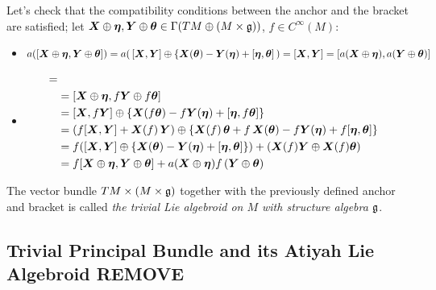 Let's check that the compatibility conditions between the anchor and the bracket are satisfied; let $\bm{X} \oplus \bm{\eta}, \bm{Y} \oplus \bm{\theta} \in \Gamma(TM \oplus (M \times \mathfrak{g}))$, $f \in C^\infty(M)$:

    \begin{itemize}
    \item $a([\bm{X} \oplus \bm{\eta}, \bm{Y} \oplus \bm{\theta}]) = a(\, [\bm{X}, \bm{Y}] \oplus \{\bm{X}(\bm{\theta}) - \bm{Y}(\bm{\eta}) + [\bm{\eta}, \bm{\theta}] \,) = [\bm{X}, \bm{Y}] = [a(\bm{X} \oplus \bm{\eta}), a(\bm{Y} \oplus \bm{\theta})]$
    
    \item 
    \begin{align*}
        [\sect X \oplus \sect \eta, &f\cdot (\sect Y \oplus \sect \theta)] =\\
        &= [\sect X \oplus \sect \eta, f\sect Y \oplus f\sect \theta] \\
        &=  [\sect X, f\sect Y] \oplus \{\sect X(f\sect \theta) - f\sect Y(\sect \eta) + [\sect \eta, f\sect \theta]\} \\
        &= (f[\sect X, \sect Y] + \sect X(f)\,\sect Y) \oplus \{\sect X(f)\,\sect \theta + f\,\sect X(\sect \theta) - f\sect Y(\sect \eta) + f[\sect \eta, \sect \theta]\} \\
        &=f([\sect X, \sect Y] \oplus \{ \sect X(\sect \theta) -\sect Y(\sect \eta) + [\sect \eta, \sect \theta]\} ) + (\sect X(f) \sect Y \oplus \sect X(f)\sect \theta) \\
        &= f[\sect X \oplus \sect \eta, \sect Y \oplus \sect \theta] + a(\sect X \oplus \sect \eta)f \, (\sect Y \oplus \sect \theta)
    \end{align*}
    \end{itemize}

The vector bundle $TM \times (M \times \mathfrak{g})$ together with the previously defined anchor and bracket is called \emph{the trivial Lie algebroid on $M$ with structure algebra $\mathfrak{g}$}.






\subsection{Trivial Principal Bundle and its Atiyah Lie Algebroid REMOVE}

